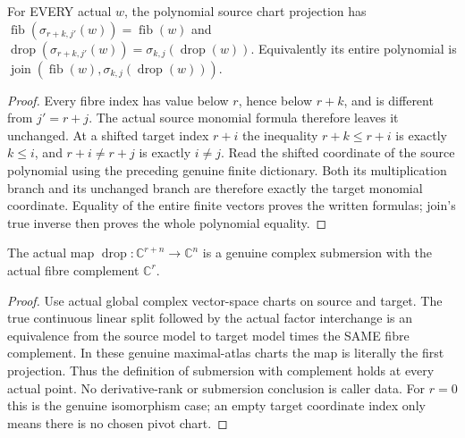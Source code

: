 \begin{theorem}
\label{hir:submersion-monomial-chart-commutation}
\leanok
{}
For EVERY actual $w$, the polynomial source chart projection has $\operatorname{fib}(\sigma_{r+k,j'}(w))=\operatorname{fib}(w)$ and $\operatorname{drop}(\sigma_{r+k,j'}(w))=\sigma_{k,j}(\operatorname{drop}(w))$. Equivalently its entire polynomial is $\operatorname{join}(\operatorname{fib}(w),\sigma_{k,j}(\operatorname{drop}(w)))$.
\end{theorem}
\begin{proof}
Every fibre index has value below $r$, hence below $r+k$, and is different from $j'=r+j$. The actual source monomial formula therefore leaves it unchanged. At a shifted target index $r+i$ the inequality $r+k\leq r+i$ is exactly $k\leq i$, and $r+i\neq r+j$ is exactly $i\neq j$. Read the shifted coordinate of the source polynomial using the preceding genuine finite dictionary. Both its multiplication branch and its unchanged branch are therefore exactly the target monomial coordinate. Equality of the entire finite vectors proves the written formulas; join's true inverse then proves the whole polynomial equality.
\end{proof}

\begin{theorem}
\label{hir:submersion-monomial-chart-smooth-drop}
\leanok
{}
The actual map $\operatorname{drop}:\mathbb C^{r+n}\to\mathbb C^n$ is a genuine complex submersion with the actual fibre complement $\mathbb C^r$.
\end{theorem}
\begin{proof}
Use actual global complex vector-space charts on source and target. The true continuous linear split followed by the actual factor interchange is an equivalence from the source model to target model times the SAME fibre complement. In these genuine maximal-atlas charts the map is literally the first projection. Thus the definition of submersion with complement holds at every actual point. No derivative-rank or submersion conclusion is caller data. For $r=0$ this is the genuine isomorphism case; an empty target coordinate index only means there is no chosen pivot chart.
\end{proof}

